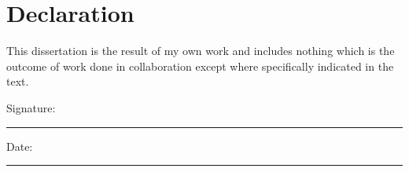 \chapter*{Declaration}

\vfill

This dissertation is the result of my own work and includes nothing which is the outcome of work done in collaboration except where specifically indicated in the text. 

\vspace{10ex}

\begin{flushright}
Signature: \rule[0pt]{60mm}{0.5pt}

\vspace{5ex}

Date: \rule[0pt]{60mm}{0.5pt}
\end{flushright}

\vfill
